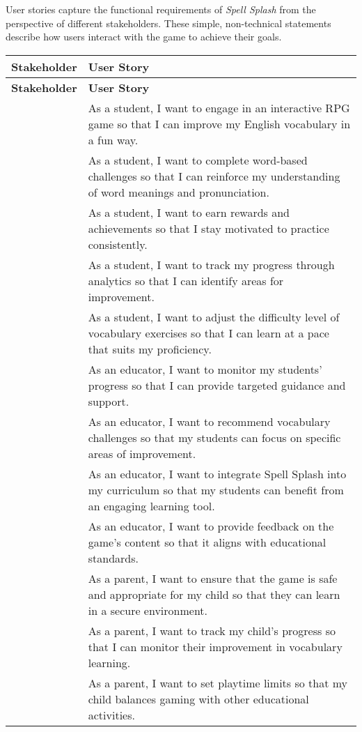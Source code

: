 User stories capture the functional requirements of \textit{Spell Splash} from the perspective of different stakeholders. These simple, non-technical statements describe how users interact with the game to achieve their goals.

\vspace{1em}

\begin{longtable}{|>{\RaggedRight\arraybackslash\bfseries}p{4cm}|>{\RaggedRight\arraybackslash}p{11cm}|}
\hline
\textbf{Stakeholder} & \textbf{User Story} \\
\hline
\endfirsthead

\hline
\textbf{Stakeholder} & \textbf{User Story} \\
\hline
\endhead

\multirow{5}{=}{Student}
& As a student, I want to engage in an interactive RPG game so that I can improve my English vocabulary in a fun way. \\
\cline{2-2}
& As a student, I want to complete word-based challenges so that I can reinforce my understanding of word meanings and pronunciation. \\
\cline{2-2}
& As a student, I want to earn rewards and achievements so that I stay motivated to practice consistently. \\
\cline{2-2}
& As a student, I want to track my progress through analytics so that I can identify areas for improvement. \\
\cline{2-2}
& As a student, I want to adjust the difficulty level of vocabulary exercises so that I can learn at a pace that suits my proficiency. \\
\hline

\multirow{4}{=}{Educator \& Language Tutor}
& As an educator, I want to monitor my students’ progress so that I can provide targeted guidance and support. \\
\cline{2-2}
& As an educator, I want to recommend vocabulary challenges so that my students can focus on specific areas of improvement. \\
\cline{2-2}
& As an educator, I want to integrate Spell Splash into my curriculum so that my students can benefit from an engaging learning tool. \\
\cline{2-2}
& As an educator, I want to provide feedback on the game’s content so that it aligns with educational standards. \\
\hline

\multirow{3}{=}{Parent \& Guardian}
& As a parent, I want to ensure that the game is safe and appropriate for my child so that they can learn in a secure environment. \\
\cline{2-2}
& As a parent, I want to track my child's progress so that I can monitor their improvement in vocabulary learning. \\
\cline{2-2}
& As a parent, I want to set playtime limits so that my child balances gaming with other educational activities. \\
\hline


\end{longtable}
